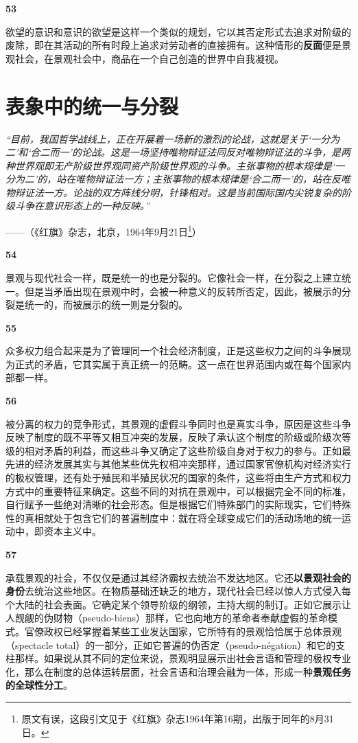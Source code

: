 \documentclass[fontset=fandol, a4paper, 12pt, openright]{ctexbook}
\makeatletter
\renewenvironment{quote}
  {\list{}{\rightmargin\leftmargin}%
   \item\relax\small\itshape\color{darkgray}}
  {\endlist}
\newcommand{\thesis}[1]{%
    \par\vspace{1.5em}%
    {\centering \textbf{\Large #1}\par}%
    \nobreak\vspace{0.5em}\nobreak
    \@afterindenttrue %
    \@afterheading    %
}
\makeatother
\begin{document}
\thesis{53}
欲望的意识和意识的欲望是这样一个类似的规划，它以其否定形式去追求对阶级的废除，即在其活动的所有时段上追求对劳动者的直接拥有。这种情形的\textbf{反面}便是景观社会，在景观社会中，商品在一个自己创造的世界中自我凝视。


\chapter{表象中的统一与分裂}

\begin{quote}
“目前，我国哲学战线上，正在开展着一场新的激烈的论战，这就是关于‘一分为二’和‘合二而一’的论战。这是一场坚持唯物辩证法同反对唯物辩证法的斗争，是两种世界观即无产阶级世界观同资产阶级世界观的斗争。主张事物的根本规律是‘一分为二’的，站在唯物辩证法一方；主张事物的根本规律是‘合二而一’的，站在反唯物辩证法一方。论战的双方阵线分明，针锋相对。这是当前国际国内尖锐复杂的阶级斗争在意识形态上的一种反映。”

\begin{flushright}
——（《红旗》杂志，北京，1964年9月21日\footnote{原文有误，这段引文见于《红旗》杂志1964年第16期，出版于同年的8月31日。}）
\end{flushright}
\end{quote}

\thesis{54}
景观与现代社会一样，既是统一的也是分裂的。它像社会一样，在分裂之上建立统一。但是当矛盾出现在景观中时，会被一种意义的反转所否定，因此，被展示的分裂是统一的，而被展示的统一则是分裂的。

\thesis{55}
众多权力组合起来是为了管理同一个社会经济制度，正是这些权力之间的斗争展现为正式的矛盾，它其实属于真正统一的范畴。这一点在世界范围内或在每个国家内部都一样。

\thesis{56}
被分离的权力的竞争形式，其景观的虚假斗争同时也是真实斗争，原因是这些斗争反映了制度的既不平等又相互冲突的发展，反映了承认这个制度的阶级或阶级次等级的相对矛盾的利益，而这些斗争又确定了这些阶级自身对于权力的参与。正如最先进的经济发展其实与其他某些优先权相冲突那样，通过国家官僚机构对经济实行的极权管理，还有处于殖民和半殖民状况的国家的条件，这些将由生产方式和权力方式中的重要特征来确定。这些不同的对抗在景观中，可以根据完全不同的标准，自行赋予一些绝对清晰的社会形态。但是根据它们特殊部门的实际现实，它们特殊性的真相就处于包含它们的普遍制度中：就在将全球变成它们的活动场地的统一运动中，即资本主义中。

\thesis{57}
承载景观的社会，不仅仅是通过其经济霸权去统治不发达地区。它还\textbf{以景观社会的身份}去统治这些地区。在物质基础还缺乏的地方，现代社会已经以惊人方式侵入每个大陆的社会表面。它确定某个领导阶级的纲领，主持大纲的制订。正如它展示让人觊觎的伪财物（pseudo-biens）那样，它也向地方的革命者奉献虚假的革命模式。官僚政权已经掌握着某些工业发达国家，它所特有的景观恰恰属于总体景观（spectacle total）的一部分，正如它普遍的伪否定（pseudo-négation）和它的支柱那样。如果说从其不同的定位来说，景观明显展示出社会言语和管理的极权专业化，那么在制度的总体运转层面，社会言语和治理会融为一体，形成一种\textbf{景观任务的全球性分工}。
\end{document}
